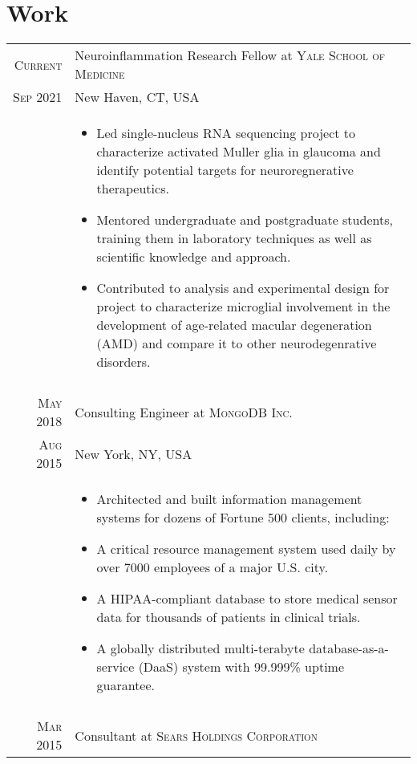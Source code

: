\documentclass[a4paper,10pt]{article}
\begin{document}
\section{Work}
\begin{longtable}{r|p{11cm}}
 \nopagebreak \textsc{Current} & Neuroinflammation Research Fellow at \textsc{Yale School of Medicine}\\
 \nopagebreak \textsc{Sep 2021} & \small{New Haven, CT, USA} \\
 \nopagebreak & \footnotesize{
	\begin{itemize}
		\item[]{
			Led single-nucleus RNA sequencing project to characterize activated Muller glia in glaucoma and identify potential targets for neuroregnerative therapeutics.
		}
		\item[]{
			Mentored undergraduate and postgraduate students, training them in laboratory techniques as well as scientific knowledge and approach.
		}
		\item[]{
			Contributed to analysis and experimental design for project to characterize microglial involvement in the development of age-related macular degeneration (AMD) and compare it to other neurodegenrative disorders.
		}
	\end{itemize}
   }\\
 \multicolumn{2}{c}{} \\
 \nopagebreak \textsc{May 2018} & Consulting Engineer at \textsc{MongoDB Inc.}\\
 \nopagebreak \textsc{Aug 2015} & \small{New York, NY, USA} \\
 \nopagebreak & \footnotesize{
	\begin{itemize}
		\item[]{
			Architected and built information management systems for dozens of Fortune 500
			clients, including:
		}
		\item[]{
			A critical resource management system used daily by over 7000 employees of a
			major U.S. city.
		}
		\item[]{
			A HIPAA-compliant database to store medical sensor data for thousands of patients
in clinical trials.
		}
		\item[]{
			A globally distributed multi-terabyte database-as-a-service (DaaS) system with
99.999\% uptime guarantee.
		}
	\end{itemize}
   }\\
 \multicolumn{2}{c}{} \\
 \nopagebreak \textsc{Mar 2015} & Consultant at \textsc{Sears Holdings Corporation}\\

\end{longtable}
\end{document}
